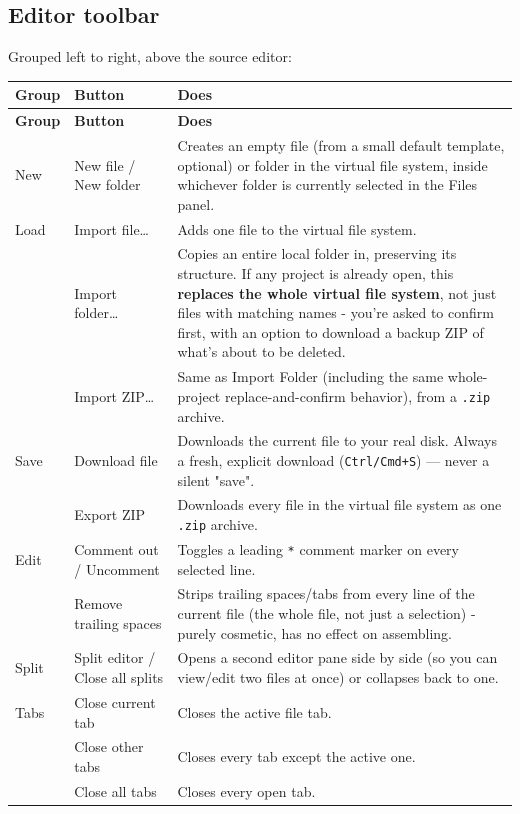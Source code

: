 \subsection*{Editor toolbar}
Grouped left to right, above the source editor:

\begin{longtable}{@{}p{3.0cm}p{3.4cm}p{7.8cm}@{}}
\toprule
\textbf{Group} & \textbf{Button} & \textbf{Does} \\
\midrule
\endfirsthead
\toprule
\textbf{Group} & \textbf{Button} & \textbf{Does} \\
\midrule
\endhead
New & New file / New folder & Creates an empty file (from a small default template, optional) or folder in the virtual file system, inside whichever folder is currently selected in the Files panel. \\
Load & Import file… & Adds one file to the virtual file system. \\
 & Import folder… & Copies an entire local folder in, preserving its structure. If any project is already open, this \textbf{replaces the whole virtual file system}, not just files with matching names - you're asked to confirm first, with an option to download a backup ZIP of what's about to be deleted. \\
 & Import ZIP… & Same as Import Folder (including the same whole-project replace-and-confirm behavior), from a \texttt{.zip} archive. \\
Save & Download file & Downloads the current file to your real disk. Always a fresh, explicit download (\texttt{Ctrl/Cmd+S}) — never a silent "save". \\
 & Export ZIP & Downloads every file in the virtual file system as one \texttt{.zip} archive. \\
Edit & Comment out / Uncomment & Toggles a leading \texttt{*} comment marker on every selected line. \\
 & Remove trailing spaces & Strips trailing spaces/tabs from every line of the current file (the whole file, not just a selection) - purely cosmetic, has no effect on assembling. \\
Split & Split editor / Close all splits & Opens a second editor pane side by side (so you can view/edit two files at once) or collapses back to one. \\
Tabs & Close current tab & Closes the active file tab. \\
 & Close other tabs & Closes every tab except the active one. \\
 & Close all tabs & Closes every open tab. \\

\end{longtable}
